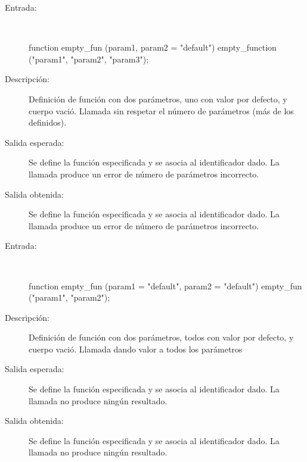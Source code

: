 	\begin{description}
		\item [Entrada:] \hfill \\
\begin{myverbatim}
   function empty_fun (param1, param2 = "default") { } 
   empty_function ("param1", "param2", "param3");
\end{myverbatim}
		\item [Descripción:] Definición de función con dos parámetros, uno con valor por defecto, y cuerpo vació. Llamada sin respetar el número de parámetros (más de los definidos). 
		\item [Salida esperada:] Se define la función especificada y se asocia al identificador dado. La llamada produce un error de número de parámetros incorrecto.
		\item [Salida obtenida:] Se define la función especificada y se asocia al identificador dado. La llamada produce un error de número de parámetros incorrecto.
	\end{description}

	\begin{description}
		\item [Entrada:] \hfill \\
\begin{myverbatim}
   function empty_fun (param1 = "default", param2 = "default") { } 
   empty_fun ("param1", "param2");
\end{myverbatim}
		\item [Descripción:] Definición de función con dos parámetros, todos con valor por defecto, y cuerpo vació. Llamada dando valor a todos los parámetros
		\item [Salida esperada:] Se define la función especificada y se asocia al identificador dado. La llamada no produce ningún resultado.
		\item [Salida obtenida:] Se define la función especificada y se asocia al identificador dado. La llamada no produce ningún resultado.
	\end{description}

